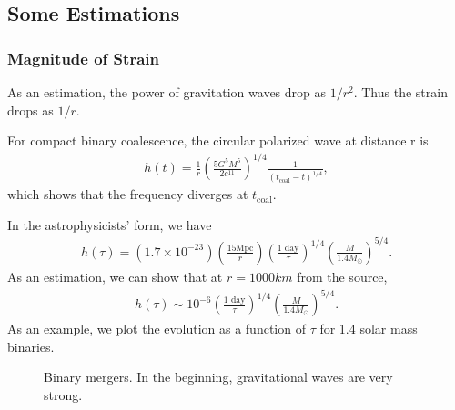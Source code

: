 \documentclass[letterpaper,12pt,english]{sphinxmanual}
\begin{document}
\subsection{Some Estimations}
\label{\detokenize{gravity/gravitational-waves:some-estimations}}

\subsubsection{Magnitude of Strain}
\label{\detokenize{gravity/gravitational-waves:magnitude-of-strain}}
As an estimation, the power of gravitation waves drop as \(1/r^2\). Thus the strain drops as \(1/r\).

For compact binary coalescence, the circular polarized wave at distance r is \label{\detokenize{gravity/gravitational-waves:id3}}{\hyperref[\detokenize{gravity/gravitational-waves:riles2013}]{\sphinxcrossref{{[}Riles2013{]}}}}
\begin{equation*}
\begin{split}h(t) =  \frac{1}{r} \left( \frac{5 G^5 M^5}{2 c^{11}} \right)^{1/4} \frac{1}{(t_{\mathrm{coal}} -t)^{1/4}},\end{split}
\end{equation*}
which shows that the frequency diverges at \(t_{\mathrm{coal}}\).

In the astrophysicists' form, we have \label{\detokenize{gravity/gravitational-waves:id4}}{\hyperref[\detokenize{gravity/gravitational-waves:riles2013}]{\sphinxcrossref{{[}Riles2013{]}}}}
\begin{equation*}
\begin{split}h(\tau) = (1.7\times 10^{-23}) \left( \frac{15\mathrm{Mpc}}{r} \right) \left( \frac{1 \text{ day} }{\tau} \right)^{1/4} \left( \frac{M}{1.4M_{\odot}}\right)^{5/4}.\end{split}
\end{equation*}
As an estimation, we can show that at \(r=1000 km\) from the source,
\begin{equation*}
\begin{split}h(\tau) \sim 10^{-6}\left( \frac{1 \text{ day} }{\tau} \right)^{1/4} \left( \frac{M}{1.4M_{\odot}}\right)^{5/4}.\end{split}
\end{equation*}
As an example, we plot the evolution as a function of \(\tau\) for 1.4 solar mass binaries.
\begin{figure}[htbp]
\centering
\capstart

\noindent{}
\caption{Binary mergers. In the beginning, gravitational waves are very strong.}\label{\detokenize{gravity/gravitational-waves:id11}}\end{figure}
\end{document}
